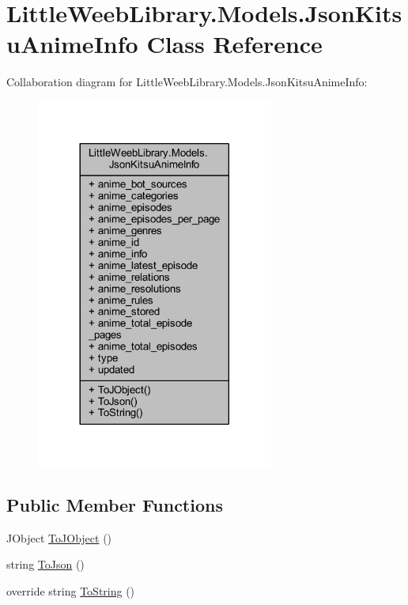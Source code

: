 \hypertarget{class_little_weeb_library_1_1_models_1_1_json_kitsu_anime_info}{}\section{Little\+Weeb\+Library.\+Models.\+Json\+Kitsu\+Anime\+Info Class Reference}
\label{class_little_weeb_library_1_1_models_1_1_json_kitsu_anime_info}


Collaboration diagram for Little\+Weeb\+Library.\+Models.\+Json\+Kitsu\+Anime\+Info\+:\nopagebreak
\begin{figure}[H]
\begin{center}
\leavevmode
\includegraphics[width=221pt]{class_little_weeb_library_1_1_models_1_1_json_kitsu_anime_info__coll__graph}
\end{center}
\end{figure}
\subsection*{Public Member Functions}
\begin{DoxyCompactItemize}
\item 
J\+Object \mbox{\hyperlink{class_little_weeb_library_1_1_models_1_1_json_kitsu_anime_info_a2c92ffb7d523c4f75497988156b64b7b}{To\+J\+Object}} ()
\item 
string \mbox{\hyperlink{class_little_weeb_library_1_1_models_1_1_json_kitsu_anime_info_a6f026c01a93f73b903cfef82d4c2dad5}{To\+Json}} ()
\item 
override string \mbox{\hyperlink{class_little_weeb_library_1_1_models_1_1_json_kitsu_anime_info_a869f64c42523b48911549a2f3fffffa7}{To\+String}} ()
\end{DoxyCompactItemize}
